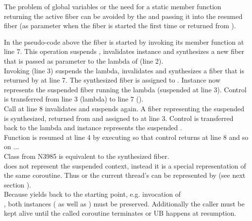 \label{solution_gpub}


\label{synthesizing}
The problem of global variables or the need for a static member function
returning the active fiber can be avoided by  the
 and passing it into the resumed fiber (as parameter when the
fiber is started the first time or returned from \resume).

In the pseudo-code above the fiber  is started by invoking its member
function \resume at line 7. This operation suspends , invalidates
instance  and synthesizes a new fiber  that is passed as parameter
to the lambda of  (line 2).\\
Invoking  (line 3) suspends the lambda, invalidates  and
synthesizes a fiber that is returned by  at line 7. The
synthesized fiber is assigned to . Instance  now represents the
suspended fiber running the lambda (suspended at line 3). Control is
transferred from line 3 (lambda) to line 7 ().\\
Call  at line 8 invalidates  and suspends 
again. A fiber representing the suspended  is synthesized, returned
from  and assigned to  at line 3. Control
is transferred back to the lambda and instance  represents the suspended
.\\
Function  is resumed at line 4 by executing  so that
control returns at line 8 and so on ...\\

Class  from N3985\cite{N3985} is
 equivalent to the synthesized fiber.\\
 does not represent the suspended context,
instead it is a special representation of the same coroutine. Thus \main or
the current thread's \entryfn\xspace can  be represented by 
(see next section ).\\
Because  yields back to the starting
point, e.g. invocation of\\
,
both instances ( as well as ) must be preserved.
Additionally the caller must be kept alive until the called coroutine terminates
or UB happens at resumption.\\

